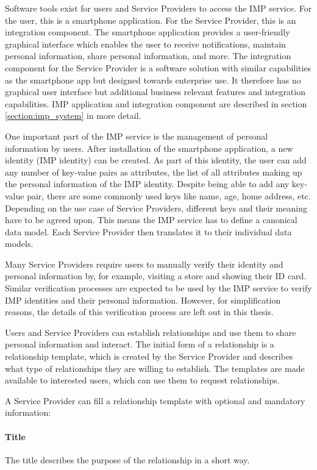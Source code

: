 Software tools exist for users and Service Providers to access the IMP service. For the user, this is a smartphone application. For the Service Provider, this is an integration component. The smartphone application provides a user-friendly graphical interface which enables the user to receive notifications, maintain personal information, share personal information, and more. The integration component for the Service Provider is a software solution with similar capabilities as the smartphone app but designed towards enterprise use. It therefore has no graphical user interface but additional business relevant features and integration capabilities. IMP application and integration component are described in section \ref{section:imp_system} in more detail.

One important part of the IMP service is the management of personal information by users. After installation of the smartphone application, a new identity (IMP identity) can be created. As part of this identity, the user can add any number of key-value pairs as attributes, the list of all attributes making up the personal information of the IMP identity. Despite being able to add any key-value pair, there are some commonly used keys like name, age, home address, etc. Depending on the use case of Service Providers, different keys and their meaning have to be agreed upon. This means the IMP service has to define a canonical data model. Each Service Provider then translates it to their individual data models.

Many Service Providers require users to manually verify their identity and personal information by, for example, visiting a store and showing their ID card. Similar verification processes are expected to be used by the IMP service to verify IMP identities and their personal information. However, for simplification reasons, the details of this verification process are left out in this thesis.

Users and Service Providers can establish relationships and use them to share personal information and interact. The initial form of a relationship is a relationship template, which is created by the Service Provider and describes what type of relationships they are willing to establish. The templates are made available to interested users, which can use them to request relationships.

A Service Provider can fill a relationship template with optional and mandatory information:

\paragraph{Title} The title describes the purpose of the relationship in a short way. 
    
